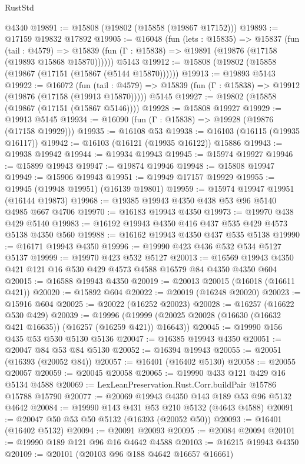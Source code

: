 \begin{lexlean}{RustStd}
\begin{coremodule}
    @4340
@19891 := @15808 (@19802 (@15858 (@19867 @17152)))
@19893 := @17159 @19832 @17892
@19905 := @16048
    (fun (lets : @15835) =>
    @15837
      (fun (tail : @4579) =>
      @15839 (fun (Γ : @15838) => @19891 (@19876 (@17158 (@19893 @15868 @15870))))))
    @5143
@19912 := @15808 (@19802 (@15858 (@19867 (@17151 (@15867 (@5144 @15870))))))
@19913 := @19893 @5143
@19922 := @16072
    (fun (tail : @4579) => @15839 (fun (Γ : @15838) => @19912 (@19876 (@17158 (@19913 @15870)))))
    @5145
@19927 := @19802 (@15858 (@19867 (@17151 (@15867 @5146))))
@19928 := @15808 @19927
@19929 := @19913 @5145
@19934 := @16090 (fun (Γ : @15838) => @19928 (@19876 (@17158 @19929)))
@19935 := @16108 @53
@19938 := @16103 (@16115 (@19935 @16117))
@19942 := @16103 (@16121 (@19935 @16122)) @15886
@19943 := @19938 @19942
@19944 := @19934 @19943
@19945 := @15974 @19927
@19946 := @15899 @19943
@19947 := @19874 @19946
@19948 := @15808 @19947
@19949 := @15906 @19943
@19951 := @19949 @17157 @19929
@19955 := @19945 (@19948 @19951) (@16139 @19801)
@19959 := @15974 @19947 @19951 (@16144 @19873)
@19968 := @19385 @19943 @4350 @438 @53 @96 @5140 @4985 @667 @4706
@19970 := @16183 @19943 @4350
@19973 := @19970 @438 @429 @5140
@19983 := @16192 @19943 @4350 @416 @437 @535 @429 @4573 @5138 @4350 @560
@19988 := @16162 @19943 @4350 @437 @535 @5138
@19990 := @16171 @19943 @4350
@19996 := @19990 @423 @436 @532 @534 @5127 @5137
@19999 := @19970 @423 @532 @5127
@20013 := @16569 @19943 @4350 @421 @121 @16 @530 @429 @4573 @4588 @16579 @84 @4350 @4350 @604
@20015 := @16588 @19943 @4350
@20019 := @20013 @20015 (@16018 (@16611 @421))
@20020 := @15892 @604
@20022 := @20019 (@16248 @20020)
@20023 := @15916 @604
@20025 := @20022 (@16252 @20023)
@20028 := @16257 (@16622 @530 @429)
@20039 := @19996
    (@19999 (@20025 @20028 (@16630 (@16632 @421 @16635)) (@16257 (@16259 @421)) @16643))
@20045 := @19990 @156 @435 @53 @530 @5130 @5136
@20047 := @16385 @19943 @4350
@20051 := @20047 @84 @53 @84 @5130
@20052 := @16394 @19943
@20055 := @20051 (@16393 (@20052 @84))
@20057 := @16401 (@16402 @5130)
@20058 := @20055 @20057
@20059 := @20045 @20058
@20065 := @19990 @433 @121 @429 @16 @5134 @4588
@20069 := LexLeanPreservation.Rust.Corr.buildPair @15786 @15788 @15790
@20077 := @20069 @19943 @4350 @143 @189 @53 @96 @5132 @4642
@20084 := @19990 @143 @431 @53 @210 @5132 (@4643 @4588)
@20091 := @20047 @50 @53 @50 @5132 (@16393 (@20052 @50))
@20093 := @16401 (@16402 @5132)
@20094 := @20091 @20093
@20095 := @20084 @20094
@20101 := @19990 @189 @121 @96 @16 @4642 @4588
@20103 := @16215 @19943 @4350
@20109 := @20101 (@20103 @96 @188 @4642 @16657 @16661)

\end{coremodule}
\end{lexlean}
